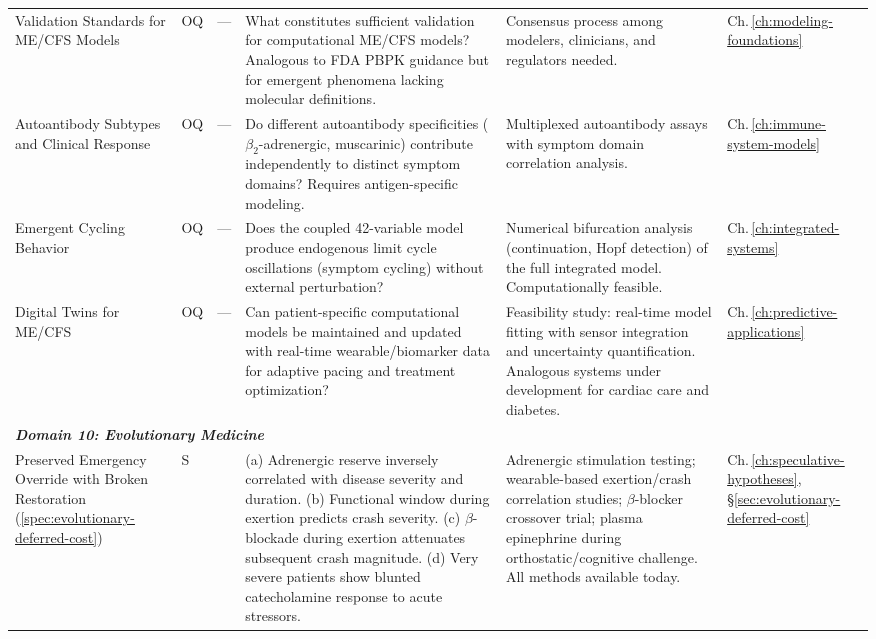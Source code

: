 \begin{longtable}{%
  p{3.0cm}
  >{\centering\arraybackslash}p{0.55cm}
  >{\centering\arraybackslash}p{1.0cm}
  p{3.8cm}
  p{3.8cm}
  p{2.2cm}
}
Validation Standards for ME/CFS Models
&
OQ & ---
&
What constitutes sufficient validation for computational ME/CFS models?
Analogous to FDA PBPK guidance but for emergent phenomena lacking molecular definitions.
&
Consensus process among modelers, clinicians, and regulators needed.
&
Ch.\,\ref{ch:modeling-foundations} \\[6pt]

Autoantibody Subtypes and Clinical Response
&
OQ & ---
&
Do different autoantibody specificities ($\beta_2$-adrenergic, muscarinic) contribute independently to distinct symptom domains?
Requires antigen-specific modeling.
&
Multiplexed autoantibody assays with symptom domain correlation analysis.
&
Ch.\,\ref{ch:immune-system-models} \\[6pt]

Emergent Cycling Behavior
&
OQ & ---
&
Does the coupled 42-variable model produce endogenous limit cycle oscillations (symptom cycling) without external perturbation?
&
Numerical bifurcation analysis (continuation, Hopf detection) of the full integrated model.
Computationally feasible.
&
Ch.\,\ref{ch:integrated-systems} \\[6pt]

Digital Twins for ME/CFS
&
OQ & ---
&
Can patient-specific computational models be maintained and updated with real-time wearable/biomarker data for adaptive pacing and treatment optimization?
&
Feasibility study: real-time model fitting with sensor integration and uncertainty quantification.
Analogous systems under development for cardiac care and diabetes.
&
Ch.\,\ref{ch:predictive-applications} \\[6pt]

\multicolumn{6}{l}{\small\textit{\textbf{Domain 10: Evolutionary Medicine}}} \\[2pt]

Preserved Emergency Override with Broken Restoration
(\ref{spec:evolutionary-deferred-cost})
&
S & 0.25
&
(a) Adrenergic reserve inversely correlated with disease severity and duration.
(b) Functional window during exertion predicts crash severity.
(c) $\beta$-blockade during exertion attenuates subsequent crash magnitude.
(d) Very severe patients show blunted catecholamine response to acute stressors.
&
Adrenergic stimulation testing; wearable-based exertion/crash correlation studies;
$\beta$-blocker crossover trial; plasma epinephrine during orthostatic/cognitive challenge.
All methods available today.
&
Ch.\,\ref{ch:speculative-hypotheses},
\S\ref{sec:evolutionary-deferred-cost} \\[6pt]


\end{longtable}
